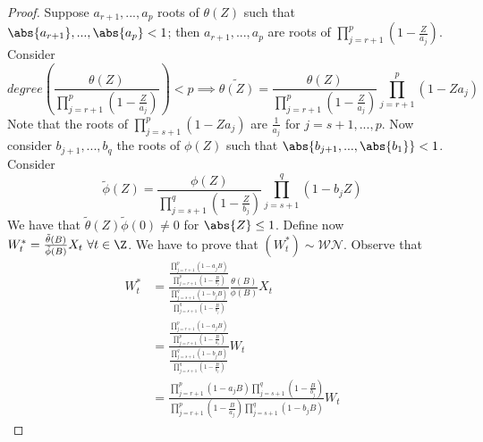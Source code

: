 
\begin{proof}
    Suppose $a_{r+1},...,a_p$ roots of $\theta(Z)$ such that $\abs{a_{r+1}},...,\abs{a_p}<1$; then $a_{r+1},...,a_p$ are roots of $\prod_{j=r+1}^p\left(1-\frac{Z}{a_j}\right)$. Consider
    \[
        degree\left(\frac{\theta(Z)}{\prod_{j=r+1}^p\left(1-\frac{Z}{a_j}\right)}\right)<p\implies\tilde{\theta(Z)}=\frac{\theta(Z)}{\prod_{j=r+1}^p\left(1-\frac{Z}{a_j}\right)}\prod_{j=r+1}^p(1-Za_j)
    \]
    Note that the roots of $\prod_{j=s+1}^p(1-Za_j)$ are $\frac{1}{a_j}$ for $j=s+1,...,p$. Now consider $b_{j+1},...,b_q$ the roots of $\phi(Z)$ such that $\abs{b_{j+1},...,\abs{b_1}}<1$. Consider
    \[
        \tilde{\phi}(Z)=\frac{\phi(Z)}{\prod_{j=s+1}^q\left(1-\frac{Z}{b_j}\right)}\prod_{j=s+1}^q\left(1-b_jZ\right)
    \]
    We have that $\tilde{\theta}(Z)\tilde{\phi}(0)\ne0$ for $\abs{Z}\le1$. Define now $W_t^*=\frac{\tilde{\theta}(B)}{\tilde{\phi}(B)}X_t\ \forall t\in\Z$. We have to prove that $(W_t^*)\sim \mathcal{WN}$. Observe that
    \begin{equation*}
        \begin{split}
            W_t^*&=\frac{\frac{\prod_{j=r+1}^p(1-a_jB)}{\prod_{j=r+1}^p\left(1-\frac{B}{a_j}\right)}}{\frac{\prod_{j=s+1}^q(1-b_jB)}{\prod_{j=s+1}^q\left(1-\frac{B}{b_j}\right)}}\frac{\theta(B)}{\phi(B)}X_t\\
            &=\frac{\frac{\prod_{j=r+1}^p(1-a_jB)}{\prod_{j=r+1}^p\left(1-\frac{B}{a_j}\right)}}{\frac{\prod_{j=s+1}^q(1-b_jB)}{\prod_{j=s+1}^q\left(1-\frac{B}{b_j}\right)}}W_t\\
            &=\frac{\prod_{j=r+1}^p(1-a_jB)\prod_{j=s+1}^q\left(1-\frac{B}{b_j}\right)}{\prod_{j=r+1}^p\left(1-\frac{B}{a_j}\right)\prod_{j=s+1}^q(1-b_jB)}W_t
        \end{split}
    \end{equation*}
\end{proof}